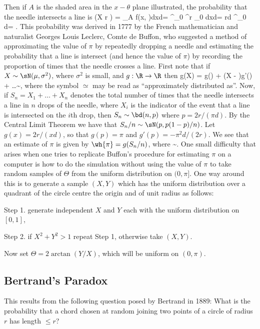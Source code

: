 Then if $A$ is the shaded area in the $x-\theta$ plane illustrated, the probability that the needle intersects a line is
\be
\pro (X \leq r \sin \Theta) = {\int\int}_{A} f(x, \theta)dxd\theta = \int^\pi_0 \int^{r \sin \theta}_0  dxd\theta = \frac r{\pi d} \int^\pi_0
\sin \theta d\theta = .
\ee
This probability was derived in 1777 by the French mathematician and naturalist Georges Louis Leclerc, Comte de Buffon, who suggested a method of approximating the value of $\pi$ by repeatedly dropping a needle and estimating the probability that a line is intersect (and hence the value of $\pi$) by recording the proportion of times that the needle crosses a line. First note that if $X \sim \sN(\mu, \sigma^2)$, where $\sigma^2$ is small, and $g : \R \to \R$ then
\be
g(X) = g(\mu) + (X - \mu)g'(\mu) + \dots \sim \sN{},
\ee
where the symbol $\simeq$ may be read as ``approximately distributed as''. Now, if $S_n = X_1 + \dots + X_n$ denotes the total number of times that the needle intersects a line in $n$ drops of the needle, where $X_i$ is the indicator of the event that a line is intersected on the $i$th drop, then $S_n \sim \bd(n, p)$ where $p = 2r/(\pi d)$. By the Central Limit Theorem we have that $S_n/n \sim \sN(p, p(1 - p)/n)$. Let $g(x) = 2r/(xd)$, so that $g(p) = \pi$ and $g'(p) = -\pi^2d/(2r)$. We see that an estimate of $\pi$ is given by $\wh{\pi} = g(S_n/n)$, where
\be
\wh{\pi} \sim \sN{}.
\ee
One small difficulty that arises when one tries to replicate Buffon's procedure for estimating $\pi$ on a computer is how to do the simulation without using the value of $\pi$ to take random samples of $\Theta$ from the uniform distribution on $(0, \pi]$. One way around this is to generate a sample $(X, Y)$ which has the uniform distribution over a quadrant of the circle centre the origin and of unit radius as follows:

Step 1. generate independent $X$ and $Y$ each with the uniform distribution on $[0, 1]$,

Step 2. if $X^2 + Y^2 > 1$ repeat Step 1, otherwise take $(X, Y )$.

Now set $\Theta = 2\arctan(Y/X)$, which will be uniform on $(0, \pi)$.

\subsection{Bertrand's Paradox}

This results from the following question posed by Bertrand in 1889: What is the probability that a chord chosen at random joining two points of a circle of radius $r$ has length $\leq r$?

